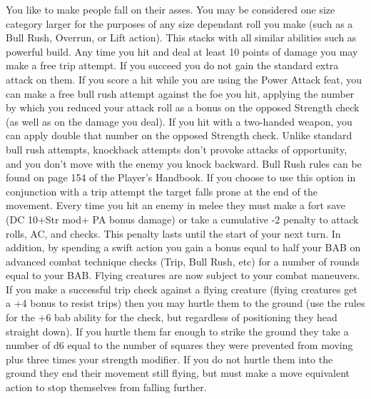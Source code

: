 \begin{multicols}{2}
\label{comm:feat:knockdown}{}
{You like to make people fall on their asses.
}{You may be considered one size category larger for the purposes of any size dependant roll you make (such as a Bull Rush, Overrun, or Lift action). This stacks with all similar abilities such as powerful build.
}{ Any time you hit and deal at least 10 points of damage you may make a free trip attempt. If you succeed you do not gain the standard extra attack on them.
}{If you score a hit while you are using the Power Attack feat, you can make a free bull rush attempt against the foe you hit, applying the number by which you reduced your attack roll as a bonus on the opposed Strength check (as well as on the damage you deal). If you hit with a two-handed weapon, you can apply double that number on the opposed Strength check. Unlike standard bull rush attempts, knockback attempts don't provoke attacks of opportunity, and you don't move with the enemy you knock backward. Bull Rush rules can be found on page 154 of the Player's Handbook.
If you choose to use this option in conjunction with a trip attempt the target falls prone at the end of the movement.
}{Every time you hit an enemy in melee they must make a fort save (DC 10+Str mod+ PA bonus damage) or take a cumulative -2 penalty to attack rolls, AC, and checks. This penalty lasts until the start of your next turn. In addition, by spending a swift action you gain a bonus equal to half your BAB on advanced combat technique checks (Trip, Bull Rush, etc) for a number of rounds equal to your BAB.
}{Flying creatures are now subject to your combat maneuvers. If you make a successful trip check against a flying creature (flying creatures get a +4 bonus to resist trips) then you may hurtle them to the ground (use the rules for the +6 bab ability for the check, but regardless of positioning they head straight down). If you hurtle them far enough to strike the ground they take a number of d6 equal to the number of squares they were prevented from moving plus three times your strength modifier.
If you do not hurtle them into the ground they end their movement still flying, but must make a move equivalent action to stop themselves from falling further.}


\end{multicols}
